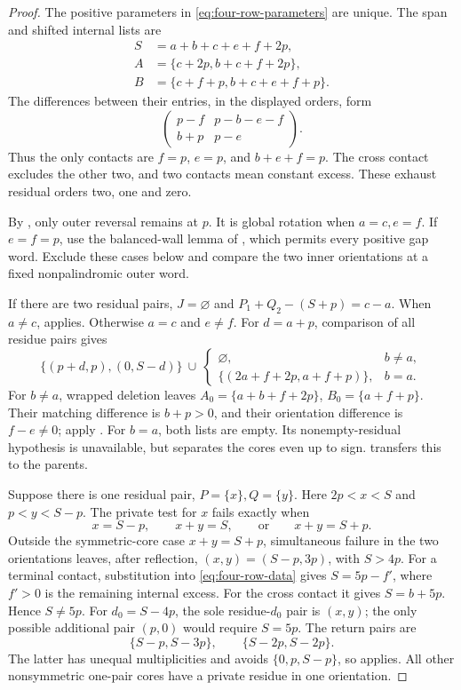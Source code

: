 \documentclass[11pt,a4paper]{amsart}
\numberwithin{equation}{section}
\theoremstyle{plain}
\theoremstyle{definition}
\begin{document}
\begin{proof}
The positive parameters in \eqref{eq:four-row-parameters} are unique.  The span and shifted internal lists are
\begin{equation}\label{eq:four-row-data}
 \begin{aligned}
 S&=a+b+c+e+f+2p,\\
 A&=\{c+2p,b+c+f+2p\},\\
 B&=\{c+f+p,b+c+e+f+p\}.
 \end{aligned}
\end{equation}
The differences between their entries, in the displayed orders, form
\[
 \begin{pmatrix}p-f&p-b-e-f\\b+p&p-e\end{pmatrix}.
\]
Thus the only contacts are \(f=p\), \(e=p\), and \(b+e+f=p\).  The cross contact excludes the other two, and two contacts mean constant excess.  These exhaust residual orders two, one and zero.

By , only outer reversal remains at \(p\).  It is global rotation when \(a=c,e=f\).  If \(e=f=p\), use the balanced-wall lemma of \cite{Shields2026PowerRigidity}, which permits every positive gap word.  Exclude these cases below and compare the two inner orientations at a fixed nonpalindromic outer word.

If there are two residual pairs, \(J=\varnothing\) and
\(P_1+Q_2-(S+p)=c-a\).  When \(a\ne c\),  applies.  Otherwise \(a=c\) and \(e\ne f\).  For \(d=a+p\), comparison of all residue pairs gives
\[
 \{(p+d,p),(0,S-d)\}
 \ \cup\ 
 \begin{cases}
 \varnothing,&b\ne a,\\
 \{(2a+f+2p,a+f+p)\},&b=a.
 \end{cases}
\]
For \(b\ne a\), wrapped deletion leaves \(A_0=\{a+b+f+2p\}\), \(B_0=\{a+f+p\}\).  Their matching difference is \(b+p>0\), and their orientation difference is \(f-e\ne0\); apply .  For \(b=a\), both lists are empty.  Its nonempty-residual hypothesis is unavailable, but  separates the cores even up to sign.   transfers this to the parents.

Suppose there is one residual pair, \(P=\{x\},Q=\{y\}\).  Here \(2p<x<S\) and \(p<y<S-p\).  The private test for \(x\) fails exactly when
\[
 x=S-p,\qquad x+y=S,\qquad\text{or}\qquad x+y=S+p.
\]
Outside the symmetric-core case \(x+y=S+p\), simultaneous failure in the two orientations leaves, after reflection,
\((x,y)=(S-p,3p)\), with \(S>4p\).  For a terminal contact, substitution into \eqref{eq:four-row-data} gives \(S=5p-f'\), where \(f'>0\) is the remaining internal excess.  For the cross contact it gives \(S=b+5p\).  Hence \(S\ne5p\).  For \(d_0=S-4p\), the sole residue-\(d_0\) pair is \((x,y)\); the only possible additional pair \((p,0)\) would require \(S=5p\).  The return pairs are
\[
 \{S-p,S-3p\},\qquad\{S-2p,S-2p\}.
\]
The latter has unequal multiplicities and avoids \(\{0,p,S-p\}\), so  applies.  All other nonsymmetric one-pair cores have a private residue in one orientation.


\end{proof}
\end{document}
